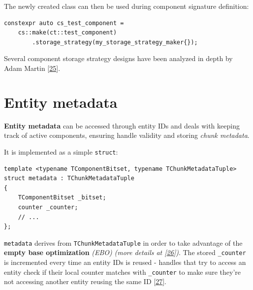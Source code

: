 \documentclass[oneside, 12pt, a4paper, openany]{book}
\begin{document}
The newly created class can then be used during component signature
definition:

\begin{verbatim}
constexpr auto cs_test_component =
    cs::make(ct::test_component)
        .storage_strategy(my_storage_strategy_maker{});
\end{verbatim}

Several component storage strategy designs have been analyzed in depth
by Adam Martin {[}\protect\hyperlink{ref-tmachine_compstorage}{25}{]}.

\hypertarget{storage_entity}{\section{Entity
metadata}\label{storage_entity}}

\textbf{Entity metadata} can be accessed through entity IDs and deals
with keeping track of active components, ensuring handle validity and
storing \emph{chunk metadata}.

It is implemented as a simple
\texttt{struct}:

\begin{verbatim}
template <typename TComponentBitset, typename TChunkMetadataTuple>
struct metadata : TChunkMetadataTuple
{
    TComponentBitset _bitset;
    counter _counter;
    // ...
};
\end{verbatim}

\texttt{metadata}
derives from
\texttt{TChunkMetadataTuple}
in order to take advantage of the \textbf{empty base optimization}
\emph{(EBO)} \emph{(more details at
{[}\protect\hyperlink{ref-cppreference_ebo}{26}{]})}. The stored
\texttt{_counter}
is incremented every time an entity IDs is reused - handles that try to
access an entity check if their local counter matches with
\texttt{_counter}
to make sure they're not accessing another entity reusing the same ID
{[}\protect\hyperlink{ref-tmachine_eids}{27}{]}.
\end{document}
